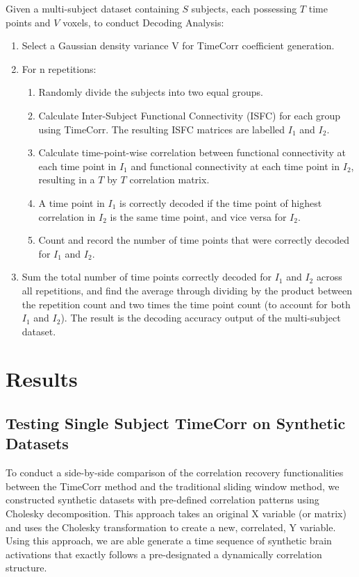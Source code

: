\documentclass[11pt]{article}
\begin{document}
\normalsize
Given a multi-subject dataset containing $S$ subjects, each possessing $T$ time points and $V$ voxels, to conduct Decoding Analysis:
\begin{enumerate}
\item Select a Gaussian density variance V for TimeCorr coefficient generation.
\item For n repetitions:
\begin{enumerate}
\item Randomly divide the subjects into two equal groups.
\item Calculate Inter-Subject Functional Connectivity (ISFC) for each group using TimeCorr. The resulting ISFC matrices are labelled $I_1$ and $I_2$.
\item Calculate time-point-wise correlation between functional connectivity at each time point in $I_1$ and functional connectivity at each time point in $I_2$, resulting in a $T$ by $T$ correlation matrix.
\item A time point in $I_1$ is correctly decoded if the time point of highest correlation in $I_2$ is the same time point, and vice versa for $I_2$.
\item Count and record the number of time points that were correctly decoded for $I_1$ and $I_2$.
\end{enumerate}
\item Sum the total number of time points correctly decoded for $I_1$ and $I_2$ across all repetitions, and find the average through dividing by the product between the repetition count and two times the time point count (to account for both $I_1$ and $I_2$). The result is the decoding accuracy output of the multi-subject dataset.
\end{enumerate}

\newpage
\section{Results}
\subsection{Testing Single Subject TimeCorr on Synthetic Datasets}
To conduct a side-by-side comparison of the correlation recovery functionalities between the TimeCorr method and the traditional sliding window method, we constructed synthetic datasets with pre-defined correlation patterns using Cholesky decomposition. This approach takes an original X variable (or matrix) and uses the Cholesky transformation to create a new, correlated, Y variable. Using this approach, we are able generate a time sequence of synthetic brain activations that exactly follows a pre-designated a dynamically correlation structure.
\end{document}
